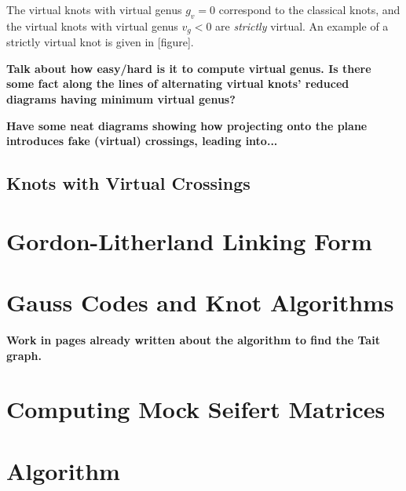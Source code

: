 \documentclass[12pt]{report}
\newcommand{\notered}[1]{{\color{Red} \textbf{#1}}}
\newcommand{\notegreen}[1]{{\color{Green} \textbf{#1}}}
\begin{document}
The virtual knots with virtual genus $g_{v} = 0$ correspond to the classical knots, and the virtual knots with virtual genus $v_{g} < 0$ are \textit{strictly} virtual. An example of a strictly virtual knot is given in [figure].

\notered{Talk about how easy/hard is it to compute virtual genus. Is there some fact along the lines of alternating virtual knots' reduced diagrams having minimum virtual genus?}

\notegreen{Have some neat diagrams showing how projecting onto the plane introduces fake (virtual) crossings, leading into...}

\section{Knots with Virtual Crossings}

\chapter{Gordon-Litherland Linking Form}

\chapter{Gauss Codes and Knot Algorithms}
\notered{Work in pages already written about the algorithm to find the Tait graph.}


\chapter{Computing Mock Seifert Matrices}

\newpage
\printbibliography[title=References]


\appendix
{}
\titlespacing*{\chapter}{0pt}{40pt}{30pt}

\chapter{Algorithm}
\end{document}
